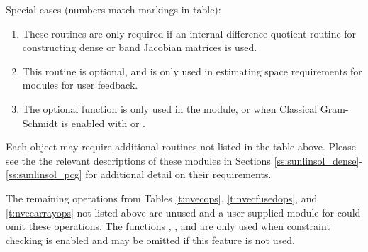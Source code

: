 Special cases (numbers match markings in table):
\begin{enumerate}
\item These routines are only required if an internal
  difference-quotient routine for constructing dense or band
  Jacobian matrices is used.
\item This routine is optional, and is only used in estimating
  space requirements for {\cvodes} modules for user feedback.
\item The optional function  is only used in the
  {\sunnonlinsolfixedpoint} module, or when Classical Gram-Schmidt is
  enabled with {\spgmr} or {\spfgmr}.
\end{enumerate}

Each {\sunlinsol} object may require additional {\nvector} routines
not listed in the table above.  Please see the the relevant
descriptions of these modules in Sections
\ref{ss:sunlinsol_dense}-\ref{ss:sunlinsol_pcg} for additional detail
on their {\nvector} requirements.

The remaining operations from Tables \ref{t:nvecops}, \ref{t:nvecfusedops}, and
\ref{t:nvecarrayops} not listed above
are unused and a user-supplied {\nvector} module for {\cvodes} could
omit these operations.  The functions ,
, and  are only used when
constraint checking is enabled and may be omitted if this feature is
not used.
















